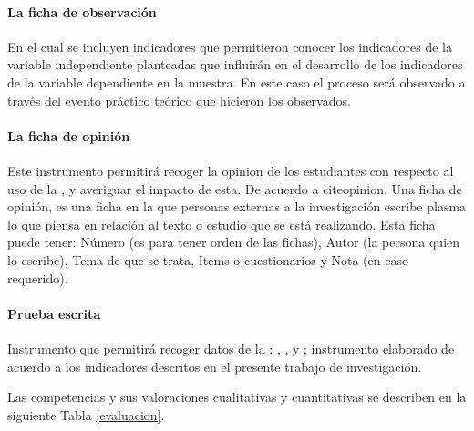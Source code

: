 \documentclass[12pt,a4paper]{article}
\begin{document}
\paragraph{La ficha de observación} En el cual se incluyen indicadores que permitieron conocer  los indicadores de la variable independiente planteadas que influirán en el desarrollo de los indicadores de la variable dependiente en la muestra. En este caso el proceso será observado a través del evento práctico teórico que hicieron los observados.



%
%
%
\paragraph{La ficha de opinión}
%
Este instrumento permitirá recoger la opinion de los estudiantes con respecto al uso de la \MakeTextLowercase{\variablei}, y averiguar el impacto de esta. De acuerdo a cite{opinion}. Una ficha de opinión, es una ficha en la que personas externas a la investigación escribe plasma lo que piensa en relación al texto o estudio que se está realizando.
%
%
%
Esta ficha puede tener: Número (es para tener orden de las fichas), Autor (la persona quien lo escribe), Tema de que se trata, Items o cuestionarios y Nota (en caso requerido).
%
%
%
\paragraph{Prueba escrita} Instrumento que permitirá recoger datos de la \MakeTextLowercase{\variablei}: \MakeTextLowercase{\dimd},  \MakeTextLowercase{\dimdd}, \MakeTextLowercase{\dimddd} y \MakeTextLowercase{\dimdddd}; instrumento elaborado de acuerdo a los indicadores descritos en el presente trabajo de investigación.

Las competencias y sus valoraciones cualitativas y cuantitativas se describen en la siguiente Tabla \ref{evaluacion}.
\end{document}

